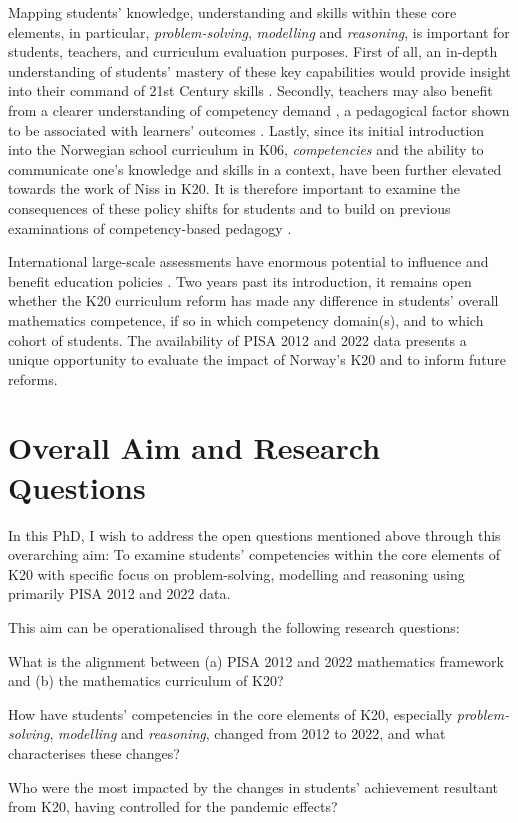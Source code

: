 \documentclass[
    a4paper,                %
    11pt,                   %
    stu,                    %
    donotrepeattitle,       %
    floatsintext,           %
    biblatex,               %
    colorlinks=true,        %
    linkcolor=red,          %
    anchorcolor=black,      %
    citecolor=blue,         %
    urlcolor=blue,          %
    bookmarks=true,         %
    bookmarksopen=false,    %
    bookmarksnumbered=true, %
    dvipsnames              %
]{apa7}
\begin{document}
Mapping students' knowledge, understanding and skills within these core elements, in particular, \emph{problem-solving}, \emph{modelling} and \emph{reasoning}, is important for students, teachers, and curriculum evaluation purposes. First of all, an in-depth understanding of students' mastery of these key capabilities would provide insight into their command of 21st Century skills \parencite[][p. 31]{oecd:2018}. Secondly, teachers may also benefit from a clearer understanding of competency demand \parencite{pettersen:2018}, a pedagogical factor shown to be associated with learners' outcomes \parencite{pettersen:2019}. Lastly, since its initial introduction into the Norwegian school curriculum in K06, \emph{competencies} and the ability to communicate one's knowledge and skills in a context, have been further elevated towards the work of Niss in K20. It is therefore important to examine the consequences of these policy shifts for students and to build on previous examinations of competency-based pedagogy \parencite[e.g., ][]{pettersen:2018}.


International large-scale assessments have enormous potential to influence and benefit education policies \parencite{nortvedt:2018}. Two years past its introduction, it remains open whether the K20 curriculum reform has made any difference in students' overall mathematics competence, if so in which competency domain(s), and to which cohort of students. The availability of PISA 2012 and 2022 data presents a unique opportunity to evaluate the impact of Norway's K20 and to inform future reforms.

\section{Overall Aim and Research Questions}

In this PhD, I wish to address the open questions mentioned above through this overarching aim: To examine students' competencies within the core elements of K20 with specific focus on problem-solving, modelling and reasoning using primarily PISA 2012 and 2022 data.

This aim can be operationalised through the following research questions:
\begin{APAenumerate}
    \item What is the alignment between (a) PISA 2012 and 2022 mathematics framework and (b) the mathematics curriculum of K20?
    \item How have students' competencies in the core elements of K20, especially \emph{problem-solving}, \emph{modelling} and \emph{reasoning}, changed from  2012 to 2022, and what characterises these changes?
    \item Who were the most impacted by the changes in students' achievement resultant from K20, having controlled for the pandemic effects?
\end{APAenumerate}
\end{document}
